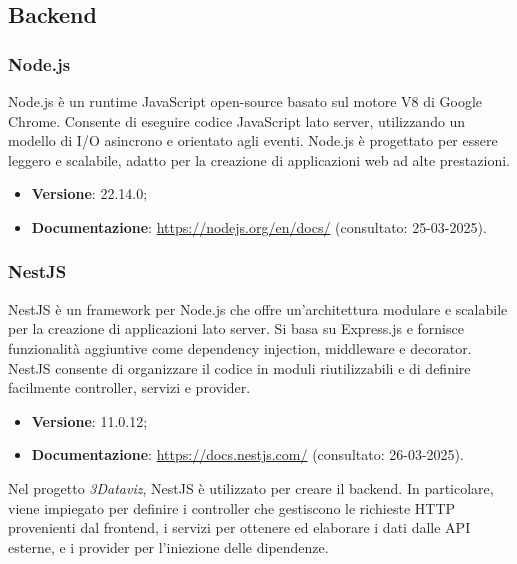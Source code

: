 \subsection{Backend}
\subsubsection{Node.js}
Node.js è un runtime JavaScript open-source basato sul motore V8 di Google
Chrome. Consente di eseguire codice JavaScript lato server, utilizzando un
modello di I/O asincrono e orientato agli eventi. Node.js è progettato per
essere leggero e scalabile, adatto per la creazione di applicazioni web ad alte
prestazioni.
\begin{itemize}
    \item \textbf{Versione}: 22.14.0;
    \item \textbf{Documentazione}: \url{https://nodejs.org/en/docs/} (consultato:
          25-03-2025).
\end{itemize}

\subsubsection{NestJS}
NestJS è un framework per Node.js che offre un'architettura modulare e
scalabile per la creazione di applicazioni lato server. Si basa su
Express.js e fornisce funzionalità aggiuntive come dependency injection,
middleware e decorator. NestJS consente di organizzare il codice in moduli
riutilizzabili e di definire facilmente controller, servizi e provider.
\begin{itemize}
    \item \textbf{Versione}: 11.0.12;
    \item \textbf{Documentazione}: \url{https://docs.nestjs.com/} (consultato:
          26-03-2025).
\end{itemize}
Nel progetto \textit{3Dataviz}, NestJS è utilizzato per creare il backend.
In particolare, viene impiegato per definire i controller che gestiscono le richieste HTTP provenienti dal frontend,
i servizi per ottenere ed elaborare i dati dalle API esterne, e i
provider per l'iniezione delle dipendenze.

